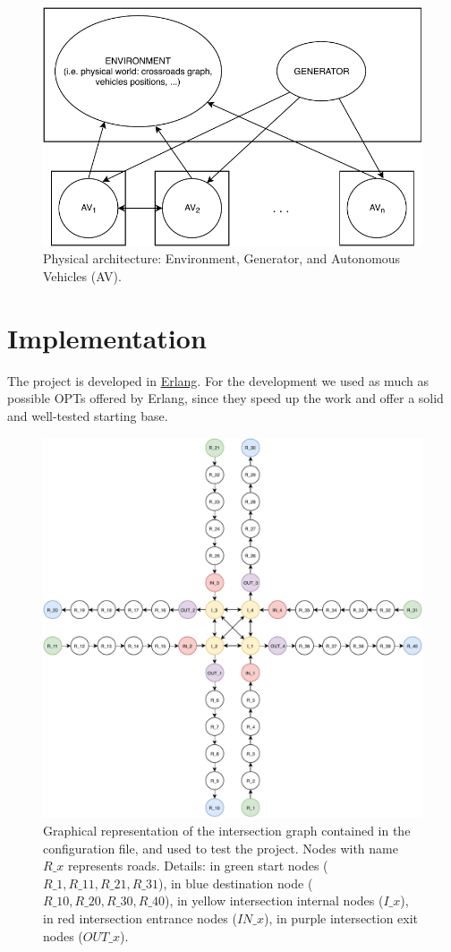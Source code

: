\documentclass{memoir}
\begin{document}
\begin{figure}
	\centering
	\includegraphics[width=0.8\linewidth]{physical_architecture.pdf}
	\caption{Physical architecture: Environment, Generator, and Autonomous Vehicles (AV).}
	\label{fig:physical-architecture}
\end{figure}


\chapter{Implementation}
The project is developed in \href{https://www.erlang.org/}{Erlang}. For the development we used as much as possible OPTs offered by Erlang, since they speed up the work and offer a solid and well-tested starting base.

\begin{figure}
	\centering
	\includegraphics[width=\linewidth]{config_graph.pdf}
	\caption{Graphical representation of the intersection graph contained in the configuration file, and used to test the project. Nodes with name $R\_x$ represents roads. Details: in green start nodes ($R\_1, R\_11, R\_21, R\_31$), in blue destination node ($R\_10, R\_20, R\_30, R\_40$), in yellow intersection internal nodes ($I\_x$), in red intersection entrance nodes ($IN\_x$), in purple intersection exit nodes ($OUT\_x$). }
	\label{fig:config-graph}
\end{figure}
\end{document}
